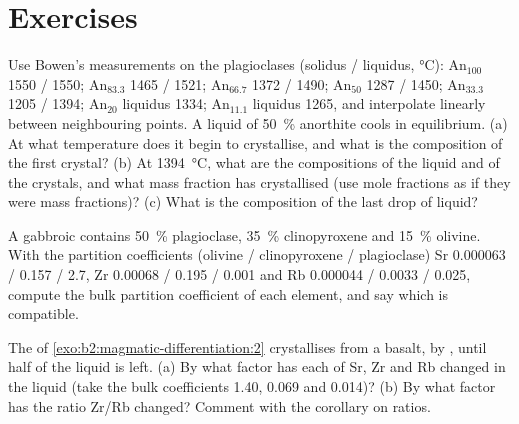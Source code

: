 \section{Exercises}

\begin{exercise}[$\star$]\label{exo:b2:magmatic-differentiation:1}
Use Bowen's measurements on the plagioclases (solidus / liquidus, \unit{\celsius}):
An$_{100}$ 1550 / 1550; An$_{83.3}$ 1465 / 1521; An$_{66.7}$ 1372 / 1490; An$_{50}$
1287 / 1450; An$_{33.3}$ 1205 / 1394; An$_{20}$ liquidus 1334; An$_{11.1}$ liquidus
1265, and interpolate linearly between neighbouring points. A liquid of
\qty{50}{\percent} anorthite cools in equilibrium. (a) At what temperature does it
begin to crystallise, and what is the composition of the first crystal? (b) At
\qty{1394}{\celsius}, what are the compositions of the liquid and of the crystals,
and what mass fraction has crystallised (use mole fractions as if they were mass
fractions)? (c) What is the composition of the last drop of liquid?
\end{exercise}

\begin{exercise}[$\star$]\label{exo:b2:magmatic-differentiation:2}
A gabbroic  contains \qty{50}{\percent} plagioclase, \qty{35}{\percent}
clinopyroxene and \qty{15}{\percent} olivine. With the partition coefficients
(olivine / clinopyroxene / plagioclase) Sr 0.000063 / 0.157 / 2.7, Zr 0.00068 /
0.195 / 0.001 and Rb 0.000044 / 0.0033 / 0.025, compute the bulk partition
coefficient of each element, and say which is compatible.
\end{exercise}

\begin{exercise}[$\star$]\label{exo:b2:magmatic-differentiation:3}
The  of \cref{exo:b2:magmatic-differentiation:2} crystallises from a basalt, by ,
until half of the liquid is left. (a) By what factor has each of Sr, Zr and Rb changed
in the liquid (take the bulk coefficients 1.40, 0.069 and 0.014)? (b) By what factor
has the ratio Zr/Rb changed? Comment with the corollary on ratios.
\end{exercise}

